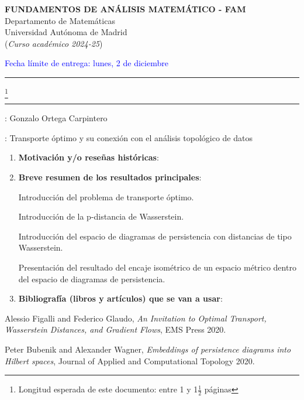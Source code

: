\documentclass[11pt,a4paper,draft]{article}
\newcommand{\blue}{\textcolor{blue}}
\begin{document}
\begin{center}{\bf FUNDAMENTOS DE ANÁLISIS MATEMÁTICO - FAM}  \\
Departamento de Matemáticas\\
Universidad Autónoma de Madrid\\
({\it Curso académico 2024-25})
\end{center}
\hfill \blue{\small Fecha límite de entrega: lunes, 2 de diciembre}
\vskip 6pt \hrule

\vskip 3mm
 \footnote{Longitud esperada de este documento:  entre 1 y 1$\frac 12$ páginas }
\vskip 3mm \hrule

\vskip 5mm

: Gonzalo Ortega Carpintero

\vskip 5mm

: Transporte óptimo y su conexión con el análisis topológico de datos



\vskip 1cm

\begin{enumerate}

\item[1.-] {\bf  Motivación y/o reseñas históricas}: 

\item[2.-] {\bf Breve resumen de los resultados principales}:

Introducción del problema de transporte óptimo.

Introducción de la p-distancia de Wasserstein.

Introducción del espacio de diagramas de persistencia con distancias de tipo Wasserstein.

Presentación del resultado del encaje isométrico de un espacio métrico dentro del espacio de diagramas de persistencia.

\item[3.-] {\bf Bibliografía (libros y artículos) que se van a usar}: 
\end{enumerate}

\begin{thebibliography}{9}

    Alessio Figalli and Federico Glaudo,
    \textit{An Invitation to Optimal Transport, Wasserstein Distances, and Gradient Flows},
    EMS Press 2020.

    Peter Bubenik and Alexander Wagner,
    \textit{Embeddings of persistence diagrams into Hilbert spaces},
    Journal of Applied and Computational Topology 2020.
    
\end{thebibliography}
\end{document}
